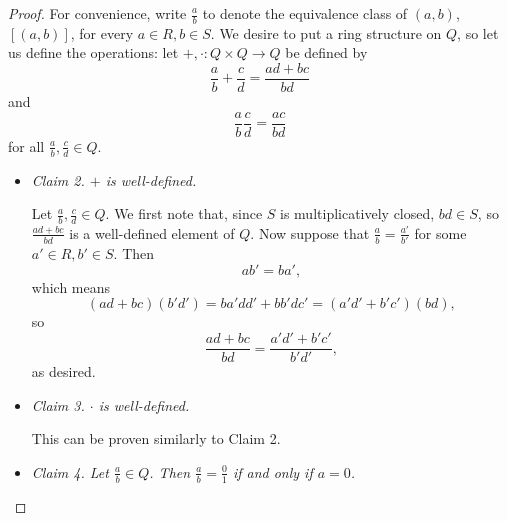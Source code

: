\documentclass[pmath347]{subfiles}
\begin{document}
\begin{proof}
        For convenience, write $\frac{a}{b}$ to denote the equivalence class of $\left( a,b \right)$, $\left[ \left( a,b \right)  \right]$, for every $a\in R, b\in S$. We desire to put a ring structure on $Q$, so let us define the operations: let $+,\cdot:Q\times Q\to Q$ be defined by
        \begin{equation*}
            \frac{a}{b} + \frac{c}{d} = \frac{ad+bc}{bd}
        \end{equation*}
        and
        \begin{equation*}
            \frac{a}{b}\frac{c}{d} = \frac{ac}{bd}
        \end{equation*}
        for all $\frac{a}{b},\frac{c}{d}\in Q$.
        \begin{itemize}
            \item \textit{Claim 2. $+$ is well-defined.}

                \begin{subproof}
                    Let $\frac{a}{b},\frac{c}{d}\in Q$. We first note that, since $S$ is multiplicatively closed, $bd\in S$, so $\frac{ad+bc}{bd}$ is a well-defined element of $Q$. Now suppose that $\frac{a}{b} = \frac{a'}{b'}$ for some $a'\in R, b'\in S$. Then
                    \begin{equation*}
                        ab' = ba',
                    \end{equation*}
                    which means
                    \begin{equation*}
                        \left( ad+bc \right) \left( b'd' \right) = ba'dd'+bb'dc' = \left( a'd'+b'c' \right) \left( bd \right) ,
                    \end{equation*}
                    so
                    \begin{equation*}
                        \frac{ad+bc}{bd} = \frac{a'd'+b'c'}{b'd'},
                    \end{equation*}
                    as desired.
                \end{subproof}

            \item \textit{Claim 3. $\cdot$ is well-defined.}

                \begin{subproof}
                    This can be proven similarly to Claim 2.
                \end{subproof}

            \item \textit{Claim 4. Let $\frac{a}{b}\in Q$. Then $\frac{a}{b}=\frac{0}{1}$ if and only if $a=0$.}


\end{itemize}
\end{proof}
\end{document}
